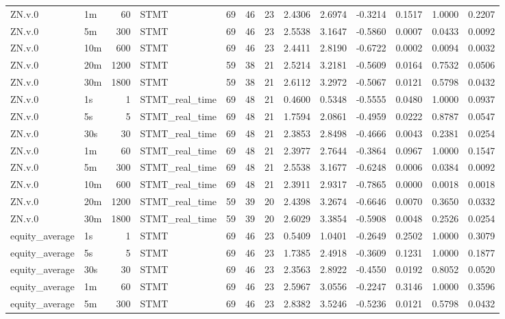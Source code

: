 \begin{tabular}{llrlrrrrrrrrr}
ZN.v.0 & 1m & 60 & STMT & 69 & 46 & 23 & 2.4306 & 2.6974 & -0.3214 & 0.1517 & 1.0000 & 0.2207 \\
ZN.v.0 & 5m & 300 & STMT & 69 & 46 & 23 & 2.5538 & 3.1647 & -0.5860 & 0.0007 & 0.0433 & 0.0092 \\
ZN.v.0 & 10m & 600 & STMT & 69 & 46 & 23 & 2.4411 & 2.8190 & -0.6722 & 0.0002 & 0.0094 & 0.0032 \\
ZN.v.0 & 20m & 1200 & STMT & 59 & 38 & 21 & 2.5214 & 3.2181 & -0.5609 & 0.0164 & 0.7532 & 0.0506 \\
ZN.v.0 & 30m & 1800 & STMT & 59 & 38 & 21 & 2.6112 & 3.2972 & -0.5067 & 0.0121 & 0.5798 & 0.0432 \\
ZN.v.0 & 1s & 1 & STMT_real_time & 69 & 48 & 21 & 0.4600 & 0.5348 & -0.5555 & 0.0480 & 1.0000 & 0.0937 \\
ZN.v.0 & 5s & 5 & STMT_real_time & 69 & 48 & 21 & 1.7594 & 2.0861 & -0.4959 & 0.0222 & 0.8787 & 0.0547 \\
ZN.v.0 & 30s & 30 & STMT_real_time & 69 & 48 & 21 & 2.3853 & 2.8498 & -0.4666 & 0.0043 & 0.2381 & 0.0254 \\
ZN.v.0 & 1m & 60 & STMT_real_time & 69 & 48 & 21 & 2.3977 & 2.7644 & -0.3864 & 0.0967 & 1.0000 & 0.1547 \\
ZN.v.0 & 5m & 300 & STMT_real_time & 69 & 48 & 21 & 2.5538 & 3.1677 & -0.6248 & 0.0006 & 0.0384 & 0.0092 \\
ZN.v.0 & 10m & 600 & STMT_real_time & 69 & 48 & 21 & 2.3911 & 2.9317 & -0.7865 & 0.0000 & 0.0018 & 0.0018 \\
ZN.v.0 & 20m & 1200 & STMT_real_time & 59 & 39 & 20 & 2.4398 & 3.2674 & -0.6646 & 0.0070 & 0.3650 & 0.0332 \\
ZN.v.0 & 30m & 1800 & STMT_real_time & 59 & 39 & 20 & 2.6029 & 3.3854 & -0.5908 & 0.0048 & 0.2526 & 0.0254 \\
equity_average & 1s & 1 & STMT & 69 & 46 & 23 & 0.5409 & 1.0401 & -0.2649 & 0.2502 & 1.0000 & 0.3079 \\
equity_average & 5s & 5 & STMT & 69 & 46 & 23 & 1.7385 & 2.4918 & -0.3609 & 0.1231 & 1.0000 & 0.1877 \\
equity_average & 30s & 30 & STMT & 69 & 46 & 23 & 2.3563 & 2.8922 & -0.4550 & 0.0192 & 0.8052 & 0.0520 \\
equity_average & 1m & 60 & STMT & 69 & 46 & 23 & 2.5967 & 3.0556 & -0.2247 & 0.3146 & 1.0000 & 0.3596 \\
equity_average & 5m & 300 & STMT & 69 & 46 & 23 & 2.8382 & 3.5246 & -0.5236 & 0.0121 & 0.5798 & 0.0432 \\

\end{tabular}

